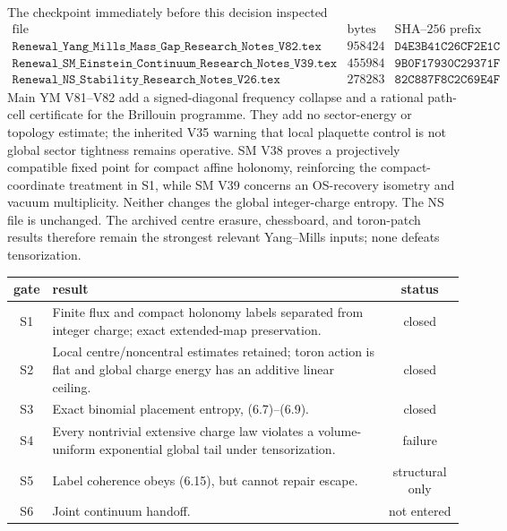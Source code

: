 \documentclass[11pt]{article}
\theoremstyle{definition}
\theoremstyle{remark}
\begin{document}
The checkpoint immediately before this decision inspected
\[
\begin{array}{l|r|l}
\text{file}&\text{bytes}&\text{SHA--256 prefix}\\ \hline
\texttt{Renewal\_Yang\_Mills\_Mass\_Gap\_Research\_Notes\_V82.tex}
 &958424&\texttt{D4E3B41C26CF2E1C}\\
\texttt{Renewal\_SM\_Einstein\_Continuum\_Research\_Notes\_V39.tex}
 &455984&\texttt{9B0F17930C29371F}\\
\texttt{Renewal\_NS\_Stability\_Research\_Notes\_V26.tex}
 &278283&\texttt{82C887F8C2C69E4F}
\end{array}                                                   \tag{6.16}
\]
Main YM V81--V82 add a signed-diagonal frequency collapse and a rational
path-cell certificate for the Brillouin programme.  They add no sector-energy
or topology estimate; the inherited V35 warning that local plaquette control
is not global sector tightness remains operative.  SM V38 proves a
projectively compatible fixed point for compact affine holonomy, reinforcing
the compact-coordinate treatment in S1, while SM V39 concerns an
OS-recovery isometry and vacuum multiplicity.  Neither changes the global
integer-charge entropy.  The NS file is unchanged.  The archived centre
erasure, chessboard, and toron-patch results therefore remain the strongest
relevant Yang--Mills inputs; none defeats tensorization.

\begin{center}
\begin{tabular}{c|p{}|c}
gate&result&status\\ \hline
S1&Finite flux and compact holonomy labels separated from integer charge;
exact extended-map preservation.&closed\\
S2&Local centre/noncentral estimates retained; toron action is flat and
global charge energy has an additive linear ceiling.&closed\\
S3&Exact binomial placement entropy, (6.7)--(6.9).&closed\\
S4&Every nontrivial extensive charge law violates a volume-uniform
exponential global tail under tensorization.&failure\\
S5&Label coherence obeys (6.15), but cannot repair escape.&structural only\\
S6&Joint continuum handoff.&not entered
\end{tabular}
\end{center}
\end{document}
